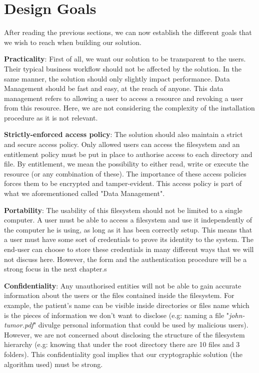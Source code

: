 \documentclass[../main.tex]{subfiles}
\begin{document}
\section{Design Goals}
\label{section:problem:design_goals}

\par After reading the previous sections, we can now establish the different goals that we wish to reach when building our solution.
\par \textbf{Practicality}: First of all, we want our solution to be transparent to the users. Their typical business workflow should not be affected by the solution. In the same manner, the solution should only slightly impact performance. Data Management should be fast and easy, at the reach of anyone.  This data management refers to allowing a user to access a resource and revoking a user from this resource. Here, we are not considering the complexity of the installation procedure as it is not relevant.
\par \textbf{Strictly-enforced access policy}: The solution should also maintain a strict and secure access policy. Only allowed users can access the filesystem and an entitlement policy must be put in place to authorise access to each directory and file. By entitlement, we mean the possibility to either read, write or execute the resource (or any combination of these). The importance of these access policies forces them to be encrypted and tamper-evident. This access policy is part of what we aforementioned called "Data Management".
\par \textbf{Portability}: The usability of this filesystem should not be limited to a single computer. A user must be able to access a filesystem and use it independently of the computer he is using, as long as it has been correctly setup. This means that a user must have some sort of credentials to prove its identity to the system. The end-user can choose to store these credentials in many different ways that we will not discuss here. However, the form and the authentication procedure will be a strong focus in the next chapter.s
\par \textbf{Confidentiality}: Any unauthorised entities will not be able to gain accurate information about the users or the files contained inside the filesystem. For example, the patient's name can be visible inside directories or files name which is the pieces of information we don't want to disclose (e.g: naming a file "\textit{john-tumor.pdf}" divulge personal information that could be used by malicious users). However, we are not concerned about disclosing the structure of the filesystem hierarchy (e.g: knowing that under the root directory there are 10 files and 3 folders). This confidentiality goal implies that our cryptographic solution (the algorithm used) must be strong. 
\end{document}
